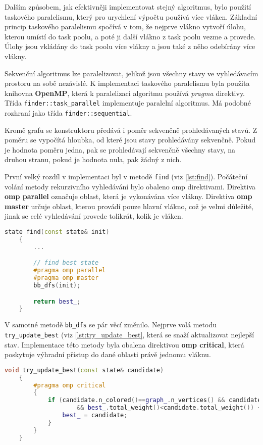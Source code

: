 Dalším způsobem, jak efektivněji implementovat stejný algoritmus, bylo použití taskového paralelismu, který pro urychlení výpočtu používá více vláken.
Základní princip taskového paralelismu spočívá v tom, že nejprve vlákno vytvoří úlohu, kterou umístí do task poolu, a poté ji další vlákno z task poolu vezme a provede.
Úlohy jsou vkládány do task poolu více vlákny a jsou také z něho odebírány více vlákny.

Sekvenční algoritmus lze paralelizovat, jelikož jsou všechny stavy ve vyhledávacím prostoru na sobě nezávislé.
K implementaci taskového paralelismu byla použita knihovna \textbf{OpenMP}, která k paralelizaci algoritmu používá \textit{pragma} direktivy.
Třída \texttt{finder::task\_parallel} implementuje paralelní algoritmus.
Má podobné rozhraní jako třída \texttt{finder::sequential}.

Kromě grafu se konstruktoru předává i poměr sekvenčně prohledávaných stavů.
Z poměru se vypočítá hloubka, od které jsou stavy prohledávány sekvenčně.
Pokud je hodnota poměru jedna, pak se prohledávají sekvenčně všechny stavy, na druhou stranu, pokud je hodnota nula, pak žádný z nich.

První velký rozdíl v implementaci byl v metodě \texttt{find} (viz \ref{lst:find}).
Počáteční volání metody rekurzivního vyhledávání bylo obaleno omp direktivami.
Direktiva \textbf{omp parallel} označuje oblast, která je vykonávána více vlákny.
Direktiva \textbf{omp master} určuje oblast, kterou provádí pouze hlavní vlákno, což je velmi důležité, jinak se celé vyhledávání provede tolikrát, kolik je vláken.

\begin{lstlisting}[language=C++, label={lst:find}, title={Metoda pro nalezení nejlepšího stavu}]
    state find(const state& init)
    {
        ...

        // find best state
        #pragma omp parallel
        #pragma omp master
        bb_dfs(init);

        return best_;
    }
\end{lstlisting}

V samotné metodě \texttt{bb\_dfs} se pár věcí změnilo.
Nejprve volá metodu \texttt{try\_update\_best} (viz \ref{lst:try_update_best}, která se snaží aktualizovat nejlepší stav.
Implementace této metody byla obalena direktivou \textbf{omp critical}, která poskytuje výhradní přístup do dané oblasti právě jednomu vláknu.

\begin{lstlisting}[language=C++, label={lst:try_update_best}, title={Metoda pro pokus o aktualizaci nejlepšího stavu}]
    void try_update_best(const state& candidate)
    {
        #pragma omp critical
        {
            if (candidate.n_colored()==graph_.n_vertices() && candidate.subgraph_connected()
                    && best_.total_weight()<candidate.total_weight()) {
                best_ = candidate;
            }
        }
    }
\end{lstlisting}

